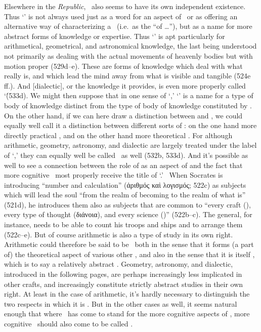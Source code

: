 \documentclass[11pt,letterpaper,oneside]{amsart} %
\begin{document}
Elsewhere in the \emph{Republic}, \episteme\ also seems to have its own independent existence. Thus `\episteme' is not always used just as a word for an aspect of \techne\ or as offering an alternative way of characterizing a \techne\ (i.e.\ as the ``\episteme of \ldots''), but as a name for more abstract forms of knowledge or expertise. Thus `\episteme' is apt particularly for arithmetical, geometrical, and astronomical knowledge, the last being understood not primarily as dealing with the actual movements of heavenly bodies but with motion proper (529d--e). These are forms of knowledge which deal with what really is, and which lead the mind away from what is visible and tangible (524e ff.). And [dialectic], or the knowledge it provides, is even more properly called `\episteme\' (533d). We might then suppose that in one sense of `\episteme,' `\episteme' is a name for a type of body of knowledge distinct from the type of body of knowledge constituted by \technai. On the other hand, if we can here draw a distinction between \techne and \episteme, we could equally well call it a distinction between different sorts of \technai: on the one hand more directly practical \technai, and on the other hand more theoretical \technai. For although arithmetic, geometry, astronomy, and dialectic are largely treated under the label of `\episteme,' they can equally well be called \technai\ as well (532b, 533d). And it's possible as well to see a connection between the role of \episteme as an aspect of \techne and the fact that more cognitive \technai\ most properly receive the title of `\episteme.' \technai\ When Socrates is introducing ``number and calculation'' (ἀριθμός καὶ λογισμός; 522c) as subjects which will lead the soul ``from the realm of becoming to the realm of what is'' (521d), he introduces them also as subjects that are common to ``every craft (\techne), every type of thought (διάνοια), and every science (\episteme)'' (522b--c). The general, for instance, needs to be able to count his troops and ships and to arrange them (522c--e). But of course arithmetic is also a type of study in its own right. Arithmetic could therefore be said to be \episteme\ both in the sense that it forms (a part of) the theoretical aspect of various other \technai, and also in the sense that it is itself \episteme, which is to say a relatively abstract \techne. Geometry, astronomy, and dialectic, introduced in the following pages, are perhaps increasingly less implicated in other crafts, and increasingly constitute strictly abstract studies in their own right. At least in the case of arithmetic, it's hardly necessary to distinguish the two respects in which it is \episteme. But in the other cases as well, it seems natural enough that where \episteme\ has come to stand for the more cognitive aspects of \techne, more cognitive \technai\ should also come to be called \epistemai.
\end{document}
